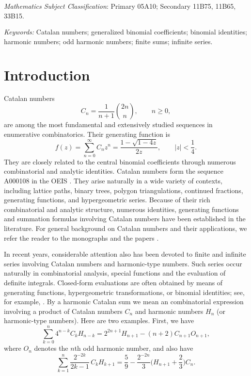 \documentclass[12pt,reqno]{article}
\begin{document}
 {\it Mathematics Subject Classification}: Primary 05A10; Secondary 11B75, 11B65, 33B15.

\medskip\noindent \emph{Keywords:} Catalan numbers; generalized binomial coefficients; binomial identities; harmonic numbers; odd harmonic numbers; finite sums; infinite series.

\bigskip

\newpage

\section{Introduction}

Catalan numbers
\begin{equation}
C_n=\frac{1}{n+1}\binom{2n}{n},\qquad  n\ge0,\label{Catalan-Def}
\end{equation}
are among the most fundamental and extensively studied sequences in enumerative combinatorics. Their generating function is 
\begin{equation}\label{C_gen_fkt}
f(z) = \sum_{n=0}^\infty C_n z^n = \frac{1-\sqrt{1-4z}}{2z}, \qquad |z|<\frac14.
\end{equation}
They are closely related to the central binomial coefficients through numerous combinatorial and analytic identities.
Catalan numbers form the sequence A000108 in the OEIS \cite{OEIS}. They arise naturally in a wide variety of contexts, including lattice paths, binary trees, polygon triangulations, continued fractions, generating functions, and hypergeometric series. Because of their rich combinatorial and analytic structure, numerous identities, generating functions and summation formulas involving Catalan numbers have 
been established in the literature. For general background on Catalan numbers and their applications, we refer the reader to the monographs \cite{Koshy,Stanley} and the papers \cite{Alzer,Batir,Chu1,Chu2,Chu3,Deutsch,GSh-Indian,Mikic,Nagy,Witula}.

In recent years, considerable attention also has been devoted to finite and infinite series involving Catalan numbers and harmonic-type numbers. Such series occur naturally in combinatorial analysis, special functions and the evaluation of definite integrals. Closed-form evaluations are often obtained by means of generating functions, hypergeometric transformations, or binomial identities; see, for example, 
\cite{AFG-Axioms,AFG-Integers,AFG-Afr,AFG-Mex}. By a harmonic Catalan sum we  mean an combinatorial expression involving a product of Catalan numbers $C_n$ and harmonic numbers $H_n$ (or harmonic-type numbers). Here are two examples. First, we have \cite[Corollary 1]{AFG-Afr}
\begin{equation*}
\sum_{k=0}^n 4^{n-k} C_k H_{n-k}  = 2^{2n+1} H_{n+1} - (n+2)C_{n+1} O_{n+1},
\end{equation*}
where $O_n$ denotes the $n$th odd harmonic number, and also have \cite[Corollary 4.2]{Bataille}
\begin{equation*}
\sum_{k=1}^n \frac{2^{-2k}}{2k-1} \,C_k H_{k+1} = \frac{5}{9} - \frac{2^{-2n}}{3} \Big (H_{n+1} + \frac{2}{3}\Big )C_n.
\end{equation*}
\end{document}
